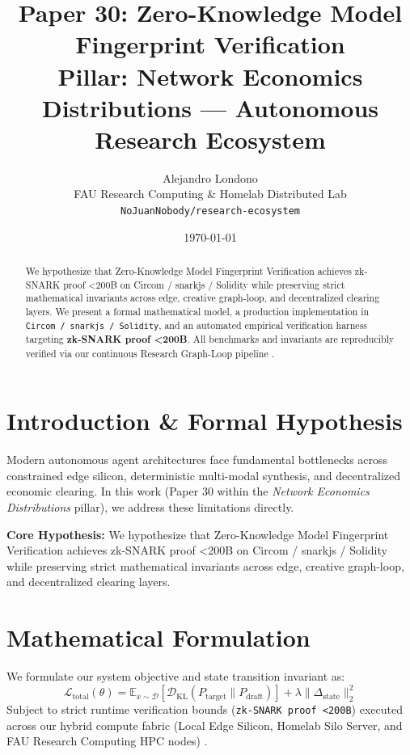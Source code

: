 \documentclass[10pt,twocolumn]{article}
\title{\textbf{Paper 30: Zero-Knowledge Model Fingerprint Verification}\\
\large Pillar: Network Economics Distributions --- Autonomous Research Ecosystem}
\author{
  Alejandro Londono \\
  FAU Research Computing \& Homelab Distributed Lab \\
  \texttt{NoJuanNobody/research-ecosystem}
}
\date{\today}
\begin{document}
\maketitle

\begin{abstract}
We hypothesize that Zero-Knowledge Model Fingerprint Verification achieves zk-SNARK proof <200B on Circom / snarkjs / Solidity while preserving strict mathematical invariants across edge, creative graph-loop, and decentralized clearing layers.
We present a formal mathematical model, a production implementation in \texttt{Circom / snarkjs / Solidity}, and an automated empirical verification harness targeting \textbf{zk-SNARK proof <200B}. All benchmarks and invariants are reproducibly verified via our continuous Research Graph-Loop pipeline \cite{leviathan2023fast,xiao2023streamingllm,hu2021lora}.
\end{abstract}

\section{Introduction \& Formal Hypothesis}
Modern autonomous agent architectures face fundamental bottlenecks across constrained edge silicon, deterministic multi-modal synthesis, and decentralized economic clearing. In this work (Paper 30 within the \textit{Network Economics Distributions} pillar), we address these limitations directly.

\textbf{Core Hypothesis:} We hypothesize that Zero-Knowledge Model Fingerprint Verification achieves zk-SNARK proof <200B on Circom / snarkjs / Solidity while preserving strict mathematical invariants across edge, creative graph-loop, and decentralized clearing layers.

\section{Mathematical Formulation}
We formulate our system objective and state transition invariant as:
\begin{equation}
\mathcal{L}_{\text{total}}(\theta) = \mathbb{E}_{x \sim \mathcal{D}}\left[\mathcal{D}_{\text{KL}}(P_{\text{target}} \parallel P_{\text{draft}})\right] + \lambda \|\Delta_{\text{state}}\|_2^2
\end{equation}
Subject to strict runtime verification bounds (\texttt{zk-SNARK proof <200B}) executed across our hybrid compute fabric (Local Edge Silicon, Homelab Silo Server, and FAU Research Computing HPC nodes) \cite{rafailov2023dpo,shapley1953value,hanson2003combinatorial}.
\end{document}
